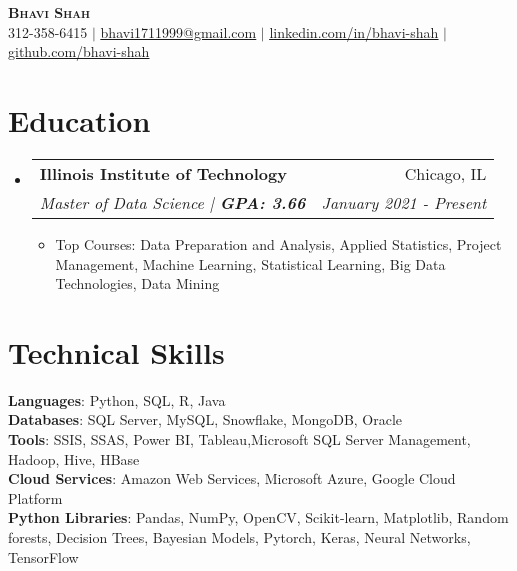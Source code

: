 \documentclass[letterpaper,11pt]{article}
\makeatletter
\newcommand{\resumeItem}[1]{
  \item\small{
    {#1 \vspace{-3pt}}
  }
}
\newcommand{\resumeSubheading}[4]{
  \vspace{-2pt}\item
    \begin{tabular*}{0.97\textwidth}[t]{l@{\extracolsep{\fill}}r}
      \textbf{#1} & #2 \\
      \textit{\small#3} & \textit{\small #4} \\
    \end{tabular*}\vspace{-7pt}
}
\newcommand{\resumeSubHeadingListStart}{\begin{itemize}[leftmargin=0.15in, label={}]}
\newcommand{\resumeSubHeadingListEnd}{\end{itemize}}
\newcommand{\resumeItemListStart}{\begin{itemize}}
\newcommand{\resumeItemListEnd}{\end{itemize}\vspace{-5pt}}
\makeatother
\begin{document}


\begin{center}
    \textbf{\Huge \scshape Bhavi Shah} \\ \vspace{1pt}
    \small 312-358-6415 $|$ \href{mailto:bhavi1711999@gmail.com }{\underline{bhavi1711999@gmail.com}} $|$ 
    \href{https://www.linkedin.com/in/bhavi--shah/}{\underline{linkedin.com/in/bhavi-shah}} $|$
    \href{https://github.com/bhavi1719}{\underline{github.com/bhavi-shah}}
\end{center}


\section{Education}
  \resumeSubHeadingListStart
    \resumeSubheading
      {Illinois Institute of Technology }{Chicago, IL}
      {Master of Data Science |\textbf{ GPA: 3.66}}{January 2021 - Present}
          \resumeItemListStart
            \resumeItem{Top Courses: Data Preparation and Analysis, Applied Statistics, Project Management, Machine Learning, Statistical Learning, Big Data Technologies, Data Mining  }
        \resumeItemListEnd
  \resumeSubHeadingListEnd
  
\section{Technical Skills}
 \begin{itemize}[leftmargin=0.15in, label={}]
    \small{\item{
     \textbf{Languages}{: Python, SQL, R, Java} \\
     \textbf{Databases}{: SQL Server, MySQL, Snowflake, MongoDB, Oracle} \\
     \textbf{Tools}{: SSIS, SSAS, Power BI, Tableau,Microsoft SQL Server Management, Hadoop, Hive, HBase } \\
     \textbf{Cloud Services}{: Amazon Web Services, Microsoft Azure, Google Cloud Platform} \\
      \textbf{Python Libraries}{: Pandas, NumPy, OpenCV, Scikit-learn, Matplotlib, Random forests, Decision Trees, Bayesian Models, Pytorch, Keras, Neural Networks, TensorFlow} \\
     
    }}
 \end{itemize}


\end{document}
